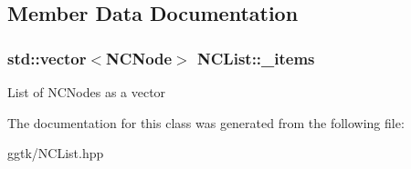 \subsection{Member Data Documentation}
\subsubsection[{\texorpdfstring{\+\_\+items}{_items}}]{\setlength{\rightskip}{0pt plus 5cm}std\+::vector$<${\bf N\+C\+Node}$>$ N\+C\+List\+::\+\_\+items}\hypertarget{classNCList_a2999e47110bf2e20bb9fd8e8689715e3}{}\label{classNCList_a2999e47110bf2e20bb9fd8e8689715e3}
List of N\+C\+Nodes as a vector 

The documentation for this class was generated from the following file\+:\begin{DoxyCompactItemize}
\item 
ggtk/N\+C\+List.\+hpp\end{DoxyCompactItemize}
